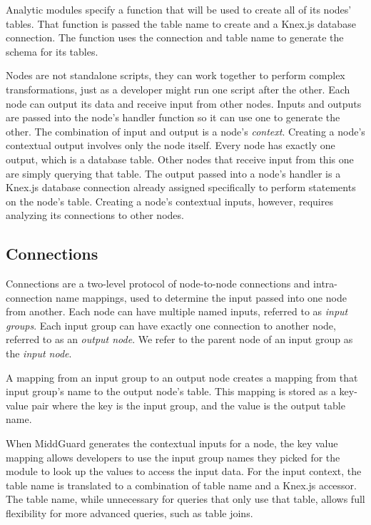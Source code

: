 \documentclass[midd]{thesis}
\begin{document}
Analytic modules specify a function that will be used to create all of its
nodes' tables. That function is passed the table name to create and a Knex.js
database connection. The function uses the connection and table name to generate
the schema for its tables.

Nodes are not standalone scripts, they can work together to perform complex
transformations, just as a developer might run one script after the other. Each
node can output its data and receive input from other nodes. Inputs and outputs
are passed into the node's handler function so it can use one to generate the
other. The combination of input and output is a node's \textit{context}.
Creating a node's contextual output involves only the node itself. Every node
has exactly one output, which is a database table. Other nodes that receive
input from this one are simply querying that table. The output passed into a
node's handler is a Knex.js database connection already assigned specifically to
perform statements on the node's table. Creating a node's contextual inputs,
however, requires analyzing its connections to other nodes.

\subsection{Connections}

Connections are a two-level protocol of node-to-node connections and
intra-connection name mappings, used to determine the input passed into one node
from another. Each node can have multiple named inputs, referred to as
\textit{input groups}. Each input group can have exactly one connection to
another node, referred to as an \textit{output node}. We refer to the parent
node of an input group as the \textit{input node}.

A mapping from an input group to an output node creates a mapping from that
input group's name to the output node's table. This mapping is stored as a
key-value pair where the key is the input group, and the value is the output
table name.

When MiddGuard generates the contextual inputs for a node, the key value
mapping allows developers to use the input group names they picked for the
module to look up the values to access the input data. For the input context,
the table name is translated to a combination of table name and a Knex.js
accessor. The table name, while unnecessary for queries that only use that
table, allows full flexibility for more advanced queries, such as table joins.
\end{document}
